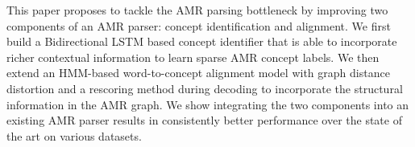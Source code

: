 This paper proposes to tackle the AMR parsing bottleneck by improving two components of an AMR parser: concept identification and alignment. We first build a Bidirectional LSTM based concept identifier that is able to incorporate richer contextual information to learn sparse AMR concept labels. We then extend an HMM-based word-to-concept alignment model with graph distance distortion and a rescoring method during decoding to incorporate the structural information in the AMR graph. We show integrating the two components into an existing AMR parser results in consistently better performance over the state of the art on various datasets.
